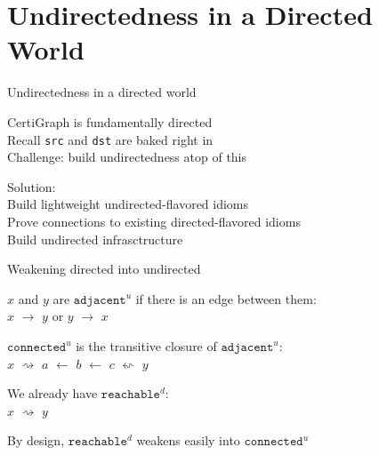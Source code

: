 \documentclass[usenames, xcolor=dvipsnames]{beamer}
\newcommand{\m}[1]{\ensuremath{\mathit{#1}}} %
\begin{document}
\section{Undirectedness in a Directed World}

\begin{frame}[fragile]{Undirectedness in a directed world}

CertiGraph is fundamentally directed \\
Recall \texttt{src} and \texttt{dst} are baked right in \\
Challenge: build undirectedness atop of this

\pause \bigskip

Solution: \\
\hspace{1em} Build lightweight undirected-flavored idioms \\
\hspace{1em} Prove connections to existing directed-flavored idioms \\
\hspace{1em} Build undirected infrasctructure

\end{frame}

\begin{frame}{Weakening directed into undirected}

\m{x} and \m{y} are $\texttt{adjacent}^{u}$ if there is an edge between them: \\
\hspace{1em} \m{x} $\rightarrow$ \m{y} or \m{y} $\rightarrow$ \m{x} \\

\pause \bigskip

$\texttt{connected}^{u}$ is the transitive closure of $\texttt{adjacent}^{u}$: \\
\hspace{1em} \m{x} $\rightsquigarrow$ \m{a} $\leftarrow$ \m{b} $\leftarrow$ \m{c} $\leftsquigarrow$ \m{y} \\

\pause \bigskip

We already have $\texttt{reachable}^{d}$: \\
\hspace{1em} \m{x} $\rightsquigarrow$ \m{y}

\pause \bigskip

By design, $\texttt{reachable}^{d}$ weakens easily into $\texttt{connected}^{u}$

\end{frame}
\end{document}
